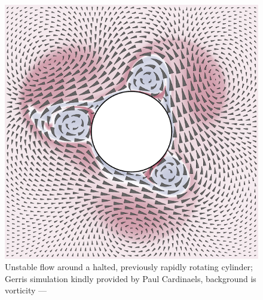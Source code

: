 \documentclass[12pt]{article}
\begin{document}
  \thispagestyle{empty}
  \begin{figure}
    \begin{center}
      \includegraphics[width=\textwidth]{compose.pdf}
    \end{center}
    \caption*{Unstable flow around a halted, previously
      rapidly rotating cylinder; Gerris simulation kindly
      provided by Paul Cardinaels, background is vorticity
      --- \vfplotversion}
  \end{figure}
\end{document}

